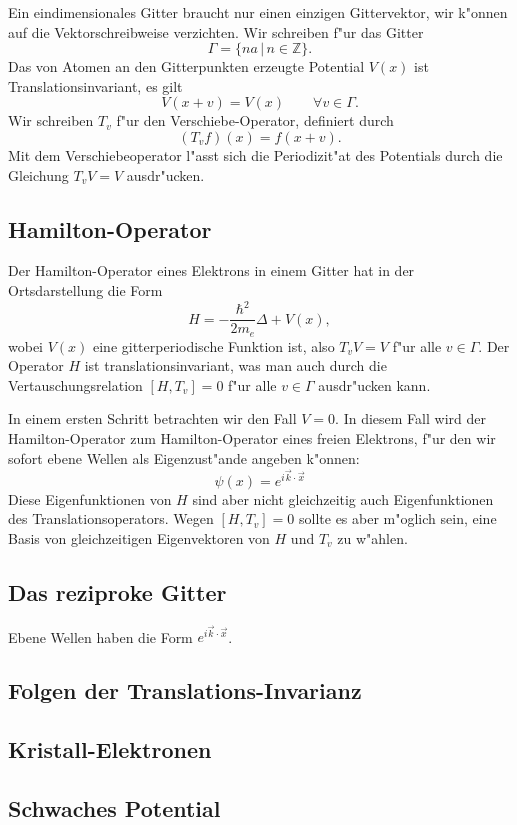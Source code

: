 Ein eindimensionales Gitter braucht nur einen einzigen Gittervektor,
wir k"onnen auf die Vektorschreibweise verzichten.
Wir schreiben f"ur das Gitter
\[
\Gamma=\{ na\,|\,n\in\mathbb Z\}.
\]
Das von Atomen an den Gitterpunkten erzeugte Potential $V(x)$
ist Translationsinvariant, es gilt
\[
V(x+v)=V(x)\qquad\forall v\in\Gamma.
\]
Wir schreiben $T_v$ f"ur den Verschiebe-Operator, definiert durch
\[
(T_vf)(x)=f(x+v).
\]
Mit dem Verschiebeoperator l"asst sich die Periodizit"at des Potentials
durch die Gleichung $T_vV=V$ ausdr"ucken.

\subsection{Hamilton-Operator}
Der Hamilton-Operator eines Elektrons in einem Gitter hat in der Ortsdarstellung
die Form
\[
H=-\frac{\hbar^2}{2m_e}\Delta + V(x),
\]
wobei $V(x)$ eine gitterperiodische Funktion ist, also $T_vV=V$ f"ur alle
$v\in\Gamma$.
Der Operator $H$ ist translationsinvariant, was man auch durch
die Vertauschungsrelation $[H,T_v]=0$ f"ur alle $v\in\Gamma$
ausdr"ucken kann.

In einem ersten Schritt betrachten wir den Fall $V=0$.
In diesem Fall wird der Hamilton-Operator zum Hamilton-Operator eines
freien Elektrons, f"ur den wir sofort ebene Wellen als Eigenzust"ande
angeben k"onnen:
\[
\psi(x)=e^{i\vec k\cdot \vec x}
\]
Diese Eigenfunktionen von $H$ sind aber nicht gleichzeitig auch
Eigenfunktionen des Translationsoperators. Wegen $[H,T_v]=0$
sollte es aber m"oglich sein, eine Basis von gleichzeitigen
Eigenvektoren von $H$ und $T_v$ zu w"ahlen.

\subsection{Das reziproke Gitter}
Ebene Wellen haben die Form $e^{i\vec k\cdot\vec x}$.

\subsection{Folgen der Translations-Invarianz}

\subsection{Kristall-Elektronen}

\subsection{Schwaches Potential}


